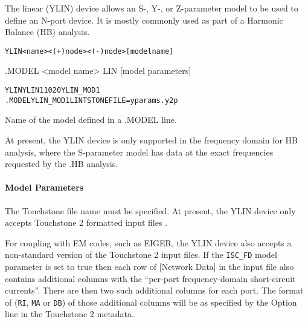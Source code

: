 

The linear (YLIN) device allows an S-, Y-, or Z-parameter model to
be used to define an N-port device.  It is mostly commonly used
as part of a Harmonic Balance (HB) analysis.

\begin{Device}\label{YLIN_DEVICE}

\device
\begin{alltt}
YLIN <name>  <(+) node> <(-) node> [model name]
\end{alltt}

\model
.MODEL <model name> LIN [model parameters]

\examples
\begin{alltt}
YLIN YLIN1 1 0 2 0 YLIN_MOD1
.MODEL YLIN_MOD1 LIN TSTONEFILE=yparams.y2p
\end{alltt}

\parameters
\begin{Parameters}

  Name of the model defined in a .MODEL line.

\end{Parameters}

\comments
At present, the YLIN device is only supported in the frequency domain for HB analysis, where
the S-parameter model has data at the exact frequencies requested by the .HB analysis.

\end{Device}


\paragraph{Model Parameters}


The Touchstone file name must be specified.  At present, the YLIN device only
accepts Touchstone 2 formatted input files \cite{touchstone2_std_2009}.

For coupling with EM codes, such as EIGER, the YLIN device also accepts
a non-standard version of the Touchstone 2 input files.  If the \texttt{ISC\_FD}
model parameter is set to true then each row of [Network Data] in the input
file also contains additional columns with the ``per-port frequency-domain
short-circuit currents''.   There are then two such additional columns for each
port. The format of (\texttt{RI}, \texttt{MA} or \texttt{DB}) of those additional
columns will be as specified by the Option line in the Touchstone 2 metadata.




